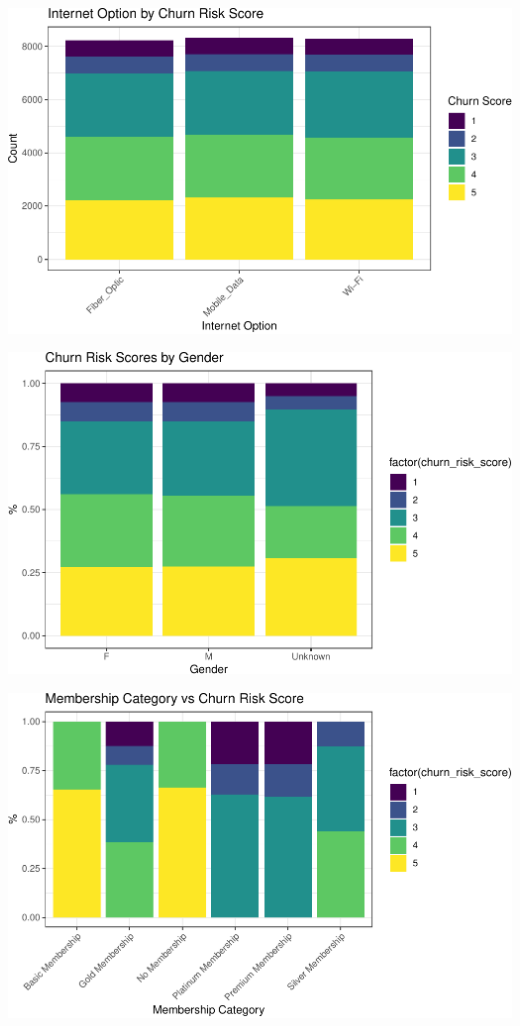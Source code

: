 \documentclass[
  letterpaper,
  DIV=11,
  numbers=noendperiod]{scrartcl}
\begin{document}
\begin{center}
\includegraphics{FPCP4_files/figure-pdf/unnamed-chunk-24-1.pdf}
\end{center}

\begin{center}
\includegraphics{FPCP4_files/figure-pdf/unnamed-chunk-25-1.pdf}
\end{center}

\begin{center}
\includegraphics{FPCP4_files/figure-pdf/unnamed-chunk-26-1.pdf}
\end{center}
\end{document}
